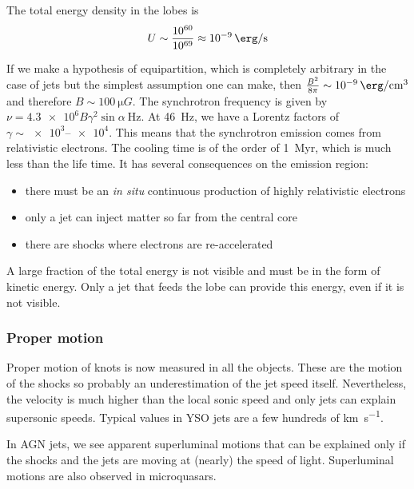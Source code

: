 \documentclass[10pt,a4paper,english]{article}
\begin{document}
The total energy density in the lobes is
\begin{equation}
    U \sim \frac{10^{60}}{10^{69}} \approx \SI{e-9}{\erg\per\s}
\end{equation}

If we make a hypothesis of equipartition, which is completely arbitrary in the
case of jets but the simplest assumption one can make, then $\frac{B^2}{8\pi}
\sim \SI{e-9}{\erg\per\cm\cubed}$ and therefore $B \sim \SI{100}{\micro G}$.
The synchrotron frequency is given by $\nu = \num{4.3e6} B\gamma^2 \sin\alpha\
\si{\Hz}$. At \SI{46}{Hz}, we have a Lorentz factors of $\gamma \sim
\numrange{e3}{e4}$. This means that the synchrotron emission comes from
relativistic electrons. The cooling time is of the order of \SI{1}{Myr}, which
is much less than the life time. It has several consequences on the emission
region:
\begin{itemize}
    \item there must be an \emph{in situ} continuous production of highly
          relativistic electrons
    \item only a jet can inject matter so far from the central core
    \item there are shocks where electrons are re-accelerated
\end{itemize}

A large fraction of the total energy is not visible and must be in the form of
kinetic energy. Only a jet that feeds the lobe can provide this energy, even if
it is not visible.

\subsubsection{Proper motion}

Proper motion of knots is now measured in all the objects. These are the motion
of the shocks so probably an underestimation of the jet speed itself.
Nevertheless, the velocity is much higher than the local sonic speed and only
jets can explain supersonic speeds. Typical values in YSO jets are a few
hundreds of \si{\km\per\s}.


In AGN jets, we see apparent superluminal motions that can be explained only if
the shocks and the jets are moving at (nearly) the speed of light. Superluminal
motions are also observed in microquasars.

\end{document}
